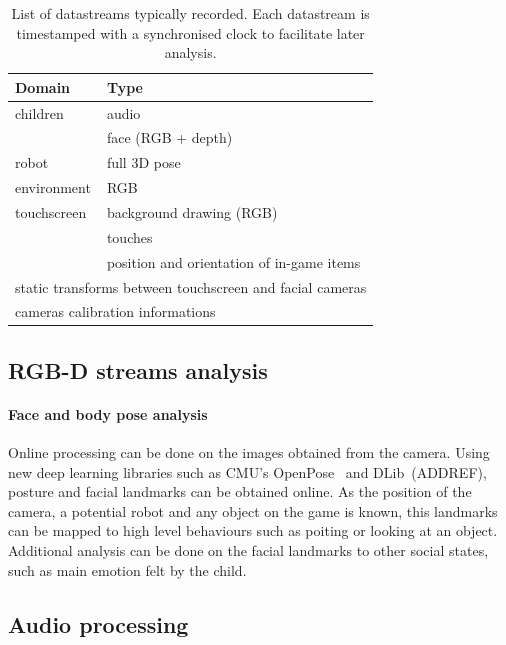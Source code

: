 \documentclass[sigconf]{acmart}
\begin{document}
\begin{table}[]
\centering
\caption{List of datastreams typically recorded. Each datastream is timestamped
with a synchronised clock to facilitate later analysis.}
\label{table|datastreams}
\begin{tabular}{@{}ll@{}}
\toprule
\bf Domain  & \bf Type                               \\ \midrule
children    & audio                                  \\
            & face (RGB + depth)                     \\
robot       & full 3D pose                           \\
environment & RGB                                    \\
touchscreen & background drawing (RGB)               \\
            & touches                                \\
            & position and orientation of in-game items         \\
 \multicolumn{2}{l}{static transforms between touchscreen and facial cameras} \\
 \multicolumn{2}{l}{cameras calibration informations}                         \\ \bottomrule
\end{tabular}
\end{table}



\subsection{RGB-D streams analysis}

\paragraph{Face and body pose analysis}

Online processing can be done on the images obtained from the camera. Using new
deep learning libraries such as CMU's OpenPose~\cite{cao2017realtime} and
DLib~(ADDREF), posture and facial landmarks can be obtained online. As the
position of the camera, a potential robot and any object on the game is known,
this landmarks can be mapped to high level behaviours such as poiting or looking
at an object. Additional analysis can be done on the facial landmarks to other
social states, such as main emotion felt by the child.

\subsection{Audio processing}
\end{document}
